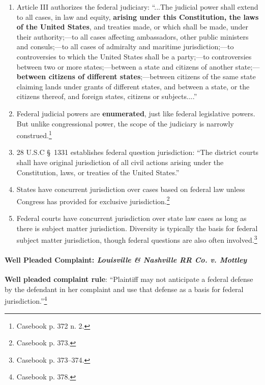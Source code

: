 \begin{enumerate}
    \item Article III authorizes the federal judiciary: ``...The judicial 
    power shall extend to all cases, in law and equity, \textbf{arising under 
    this Constitution, the laws of the United States}, and treaties made, or 
    which shall be made, under their authority;---to all cases affecting 
    ambassadors, other public ministers and consuls;---to all cases of 
    admiralty and maritime jurisdiction;---to controversies to which the 
    United States shall be a party;---to controversies between two or more 
    states;---between a state and citizens of another state;---\textbf{between 
    citizens of different states};---between citizens of the same state 
    claiming lands under grants of different states, and between a state, or 
    the citizens thereof, and foreign states, citizens or subjects....''
    \item Federal judicial powers are \textbf{enumerated}, just like federal 
    legislative powers. But unlike congressional power, the scope of the 
    judiciary is narrowly construed.\footnote{Casebook p. 372 n.  2.}
    \item 28 U.S.C \S\ 1331 establishes federal question jurisdiction: ``The 
    district courts shall have original jurisdiction of all civil actions 
    arising under the Constitution, laws, or treaties of the United States.''
    \item States have concurrent jurisdiction over cases based on federal law 
    unless Congress has provided for exclusive jurisdiction.\footnote{Casebook 
    p. 373.}
    \item Federal courts have concurrent jurisdiction over state law cases as 
    long as there is subject matter jurisdiction. Diversity is typically the 
    basis for federal subject matter jurisdiction, though federal questions 
    are also often involved.\footnote{Casebook p. 373--374.}
\end{enumerate}

\paragraph{Well Pleaded Complaint: \emph{Louisville \& Nashville RR Co. v.  
Mottley}}

\textbf{Well pleaded complaint rule}: ``Plaintiff may not anticipate a federal defense by the defendant in her complaint and use that defense as a basis for federal jurisdiction.''\footnote{Casebook p. 378.}

